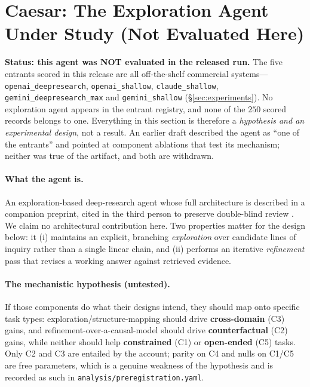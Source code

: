 \section{Caesar: The Exploration Agent Under Study (Not Evaluated Here)}
\label{sec:caesar}

\textbf{Status: this agent was NOT evaluated in the released run.} The five entrants scored in this
release are all off-the-shelf commercial systems---\texttt{openai\_deepresearch},
\texttt{openai\_shallow}, \texttt{claude\_shallow}, \texttt{gemini\_deepresearch\_max} and
\texttt{gemini\_shallow} (\S\ref{sec:experiments}). No exploration agent appears in the entrant
registry, and none of the $250$ scored records belongs to one. Everything in this section is
therefore a \emph{hypothesis and an experimental design}, not a result. An earlier draft described
the agent as ``one of the entrants'' and pointed at component ablations that test its mechanism;
neither was true of the artifact, and both are withdrawn.

\paragraph{What the agent is.} An exploration-based deep-research agent whose full architecture is
described in a companion preprint, cited in the third person to preserve double-blind review
\citep{caesar2026}. We claim no architectural contribution here. Two properties matter for the
design below: it (i) maintains an explicit, branching \emph{exploration} over candidate lines of
inquiry rather than a single linear chain, and (ii) performs an iterative \emph{refinement} pass
that revises a working answer against retrieved evidence.

\paragraph{The mechanistic hypothesis (untested).} If those components do what their designs
intend, they should map onto specific task types: exploration/structure-mapping should drive
\textbf{cross-domain} (C3) gains, and refinement-over-a-causal-model should drive
\textbf{counterfactual} (C2) gains, while neither should help \textbf{constrained} (C1) or
\textbf{open-ended} (C5) tasks. Only C2 and C3 are entailed by the account; parity on C4 and nulls
on C1/C5 are free parameters, which is a genuine weakness of the hypothesis and is recorded as such
in \texttt{analysis/preregistration.yaml}.

